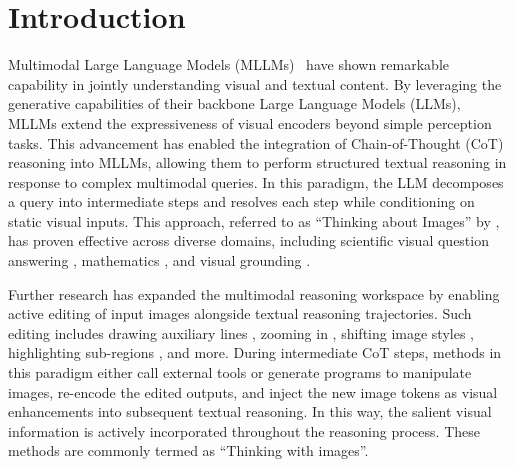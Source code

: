 


\section{Introduction}

Multimodal Large Language Models (MLLMs)~\citep{li2024llava_ov,bai2025qwen2_5,wang2025internvl3_5} have shown remarkable capability in jointly understanding visual and textual content. By leveraging the generative capabilities of their backbone Large Language Models (LLMs), MLLMs extend the expressiveness of visual encoders beyond simple perception tasks. This advancement has enabled the integration of Chain-of-Thought (CoT) reasoning into MLLMs, allowing them to perform structured textual reasoning in response to complex multimodal queries. In this paradigm, the LLM decomposes a query into intermediate steps and resolves each step while conditioning on static visual inputs. This approach, referred to as “Thinking about Images” by \citep{su2025thinking}, has proven effective across diverse domains, including scientific visual question answering \citep{zhang2023multicot}, mathematics \citep{visionr1}, and visual grounding \citep{bai2025univg}.



Further research has expanded the multimodal reasoning workspace by enabling active editing of input images alongside textual reasoning trajectories. Such editing includes drawing auxiliary lines \citep{hu2024visual}, zooming in \citep{shao2024visual,pixelreasoner,surismenon2023vipergpt}, shifting image styles \citep{liu2025Visual}, highlighting sub-regions \citep{fu2025refocus}, and more. During intermediate CoT steps, methods in this paradigm either call external tools or generate programs to manipulate images, re-encode the edited outputs, and inject the new image tokens as visual enhancements into subsequent textual reasoning. In this way,  the salient visual information is actively incorporated throughout the reasoning process. These methods are commonly termed as ``Thinking with images''.

